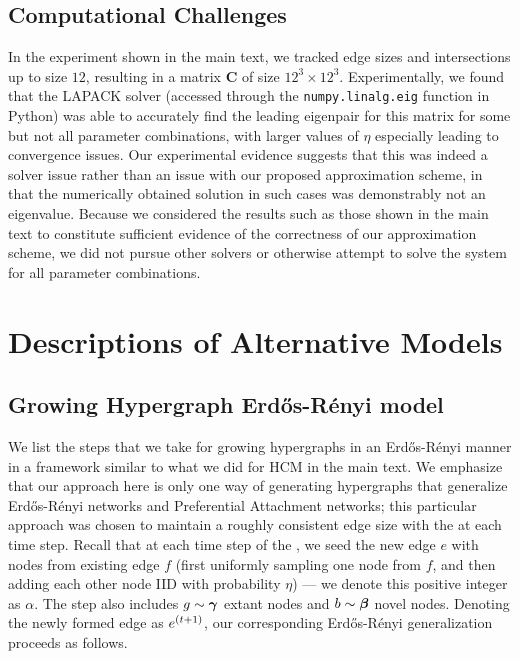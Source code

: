 \subsection{Computational Challenges}

In the experiment shown in the main text, we tracked edge sizes and intersections up to size $12$, resulting in a matrix $\mathbf{C}$ of size $12^3 \times 12^3$.
Experimentally, we found that the LAPACK solver (accessed through the \texttt{numpy.linalg.eig} function in Python) was able to accurately find the leading eigenpair for this matrix for some but not all parameter combinations, with larger values of $\eta$ especially leading to convergence issues. 
Our experimental evidence suggests that this was indeed a solver issue rather than an issue with our proposed approximation scheme, in that the numerically obtained solution in such cases was demonstrably not an eigenvalue. 
Because we considered the results such as those shown in the main text to constitute sufficient evidence of the correctness of our approximation scheme, we did not pursue other solvers or otherwise attempt to solve the system for all parameter combinations.


\section{Descriptions of Alternative Models} \label{sec:alternative-models}

\subsection{Growing Hypergraph Erd\H{o}s-R\'enyi model}

We list the steps that we take for growing hypergraphs in an Erd\H{o}s-R\'enyi manner in a framework similar to what we did for HCM in the main text. We emphasize that our approach here is only one way of generating hypergraphs that generalize Erd\H{o}s-R\'enyi networks and Preferential Attachment networks; this particular approach was chosen to maintain a roughly consistent edge size with the \model at each time step. Recall that at each time step of the \model, we seed the new edge $e$ with nodes from existing edge $f$ (first uniformly sampling one node from $f$, and then adding each other node IID with probability $\eta$) --- we denote this positive integer as $\alpha$. The \model step also includes $g \sim \boldsymbol{\gamma}$ extant nodes and $b \sim \boldsymbol{\beta}$ novel nodes. Denoting the newly formed edge as $e^{(t+1)}$, our corresponding Erd\H{o}s-R\'enyi generalization proceeds as follows.

